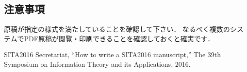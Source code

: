 \documentclass{jarticle}
\begin{document}
\subsection{注意事項}
原稿が指定の様式を満たしていることを確認して下さい．
なるべく複数のシステムでPDF原稿が閲覧・印刷できることを確認しておくと確実です．

\renewcommand{\refname}{文献}

\begin{thebibliography}{99}
SITA2016 Secretariat, 
``How to write a SITA2016 manuscript,'' 
The 39th Symposium on Information Theory and its Applications, 2016.
\end{thebibliography}
\end{document}
